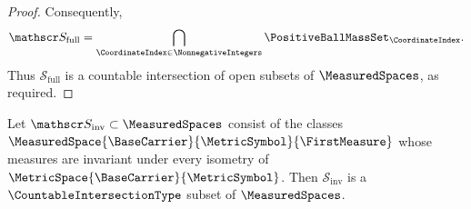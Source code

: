 \begin{proof}
Consequently,
\[
 \mathscr S_{\mathrm{full}}
 =\bigcap_{\CoordinateIndex\in\NonnegativeIntegers}\PositiveBallMassSet_\CoordinateIndex.
\]
Thus
$\mathscr S_{\mathrm{full}}$
is a countable intersection of open subsets of
$\MeasuredSpaces$,
as required.
\end{proof}

\begin{proposition}\label{lem:invariant-measures-gdelta}
Let
$\mathscr S_{\mathrm{inv}}\subset\MeasuredSpaces$
consist of the classes
$\MeasuredSpace{\BaseCarrier}{\MetricSymbol}{\FirstMeasure}$
whose measures are invariant under every isometry of
$\MetricSpace{\BaseCarrier}{\MetricSymbol}$.
Then
$\mathscr S_{\mathrm{inv}}$
is a
$\CountableIntersectionType$
subset of
$\MeasuredSpaces$.
\end{proposition}

